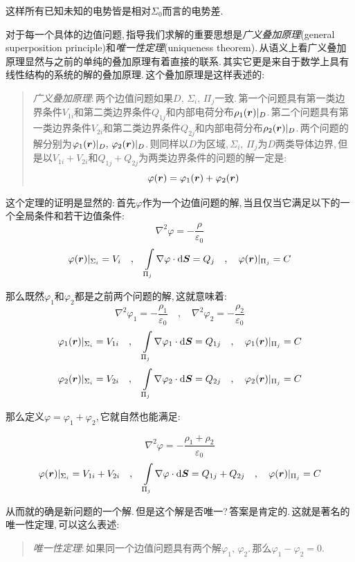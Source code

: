 这样所有已知未知的电势皆是相对$\Sigma_0$而言的电势差.


对于每一个具体的边值问题,\,指导我们求解的重要思想是\emph{广义叠加原理}(general superposition principle)和\emph{唯一性定理}(uniqueness theorem).\,从语义上看广义叠加原理显然与之前的单纯的叠加原理有着直接的联系.\,其实它更是来自于数学上具有线性结构的系统的解的叠加原理.\,这个叠加原理是这样表述的:
\begin{verse}
\emph{广义叠加原理}:\,两个边值问题如果$D,\,\Sigma_i,\,\Pi_j$一致.\,第一个问题具有第一类边界条件$V_{1i}$和第二类边界条件$Q_{1j}$和内部电荷分布$\rho_1(\boldsymbol{r})|_D$.\,第二个问题具有第一类边界条件$V_{2i}$和第二类边界条件$Q_{2j}$和内部电荷分布$\rho_2(\boldsymbol{r})|_D$.\,两个问题的解分别为$\varphi_1(\boldsymbol{r})|_D,\,\varphi_2(\boldsymbol{r})|_D$.\,则同样以$D$为区域,\,$\Sigma_i,\,\Pi_j$为$D$两类导体边界,\,但是以$V_{1i}+V_{2i}$和$Q_{1j}+Q_{2j}$为两类边界条件的问题的解一定是:
\[\varphi(\boldsymbol{r})=\varphi_1(\boldsymbol{r})+\varphi_2(\boldsymbol{r})\]
\end{verse}

这个定理的证明是显然的:\,首先$\varphi$作为一个边值问题的解,\,当且仅当它满足以下的一个全局条件和若干边值条件:
\[\nabla^2\varphi=-\frac{\rho}{\varepsilon_0}\]
\[\varphi(\boldsymbol{r})|_{\Sigma_i}=V_i \quad, \quad \int\limits_{\Pi_j}\nabla\varphi\cdot \textrm{d} \boldsymbol{S}=Q_j \quad, \quad \varphi(\boldsymbol{r})|_{\Pi_j}=C\]

那么既然$\varphi_1$和$\varphi_2$都是之前两个问题的解,\,这就意味着:
\[\nabla^2\varphi_1=-\frac{\rho_1}{\varepsilon_0} \quad,\quad \nabla^2\varphi_2=-\frac{\rho_2}{\varepsilon_0}\]
\[\varphi_1(\boldsymbol{r})|_{\Sigma_i}=V_{1i} \quad, \quad \int\limits_{\Pi_j}\nabla\varphi_1\cdot \textrm{d} \boldsymbol{S}=Q_{1j} \quad, \quad \varphi_1(\boldsymbol{r})|_{\Pi_j}=C\]
\[\varphi_2(\boldsymbol{r})|_{\Sigma_i}=V_{2i} \quad, \quad \int\limits_{\Pi_j}\nabla\varphi_2\cdot \textrm{d} \boldsymbol{S}=Q_{2j} \quad, \quad \varphi_2(\boldsymbol{r})|_{\Pi_j}=C\]

那么定义$\varphi=\varphi_1+\varphi_2$,\,它就自然也能满足:

\[\nabla^2\varphi=-\frac{\rho_1+\rho_2}{\varepsilon_0}\]
\[\varphi(\boldsymbol{r})|_{\Sigma_i}=V_{1i}+V_{2i} \quad, \quad \int\limits_{\Pi_j}\nabla\varphi\cdot \textrm{d} \boldsymbol{S}=Q_{1j}+Q_{2j} \quad, \quad \varphi(\boldsymbol{r})|_{\Pi_j}=C\]

从而就的确是新问题的一个解.\,但是这个解是否唯一?\,答案是肯定的.\,这就是著名的唯一性定理,\,可以这么表述:
\begin{verse}
\emph{唯一性定理}:\,如果同一个边值问题具有两个解$\varphi_1,\,\varphi_2$.\,那么$\varphi_1-\varphi_2= 0$.
\end{verse} 	 

